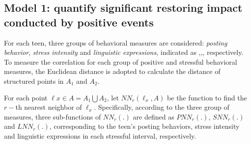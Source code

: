 \subsection{Model 1: quantify significant restoring impact conducted by positive events}
\label{mod:mod1}
For each teen, three groups of behavioral measures are considered: \emph{posting behavior},
\emph{stress intensity} and \emph{linguistic expressions},
indicated as ,,, respectively.
To measure the correlation for each group of positive and stressful behavioral measures,
the Euclidean distance is adopted to calculate the distance of structured points in $A_1$ and $A_2$.

For each point $\ell x \in A=A_1\bigcup A_2$,
let $NN_r(\ell_x,A)$ be the function to find the $r-$th nearest neighbor of $\ell_x$.
Specifically, according to the three group of measures,
three sub-functions of $NN_r(.)$ are defined as $PNN_r(.)$, $SNN_r(.)$ and $LNN_r(.)$,
corresponding to the teen's posting behaviors, stress intensity and linguistic expressions in each stressful interval,  respectively.

